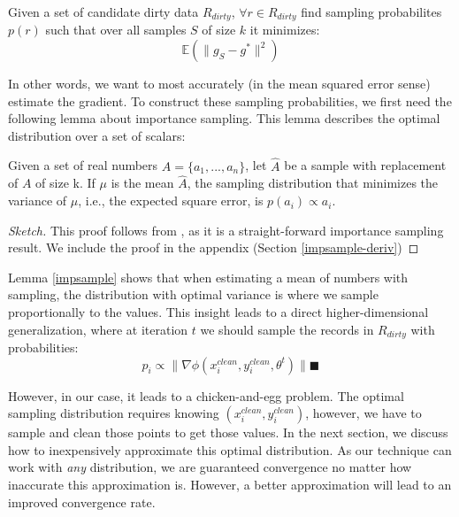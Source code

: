 \begin{definition}
Given a set of candidate dirty data $R_{dirty}$, $\forall r \in R_{dirty}$ find sampling probabilites $p(r)$ such that over all samples $S$ of size $k$ it minimizes:
\[
\mathbb{E}(\|g_S - g^*\|^2)
\]
\end{definition}
In other words, we want to most accurately (in the mean squared error sense) estimate the gradient. To construct these sampling probabilities, we first need the following lemma about importance sampling.
This lemma describes the optimal distribution over a set of scalars:
\begin{lemma}\label{impsample}
Given a set of real numbers $A = \{a_1,...,a_n\}$, let $\hat{A}$ be 
a sample with replacement of $A$ of size k.
If $\mu$ is the mean $\hat{A}$, the sampling distribution that minimizes
 the variance of $\mu$, i.e., the expected square error, is $p(a_i) \propto a_i$.
\end{lemma}
\begin{proof}[Sketch]
This proof follows from \cite{mcbook}, as it is a straight-forward importance sampling result.
We include the proof in the appendix (Section \ref{impsample-deriv})
\end{proof}

Lemma \ref{impsample} shows that when estimating a mean of numbers with sampling, the distribution with optimal variance is where we sample proportionally to the values.
This insight leads to a direct higher-dimensional generalization, where at iteration $t$ we should sample the records in $R_{dirty}$ with probabilities:
\[
p_i \propto \|\nabla\phi(x^{clean}_i,y^{clean}_i,\theta^t)\| \blacksquare
\]

However, in our case, it leads to a chicken-and-egg problem.
The optimal sampling distribution requires knowing $(x^{clean}_i,y^{clean}_i)$, however, we have to sample and clean those points to get those values.
In the next section, we discuss how to inexpensively approximate this optimal distribution.
As our technique can work with \emph{any} distribution, we are guaranteed convergence no matter how inaccurate this approximation is.
However, a better approximation will lead to an improved convergence rate.
